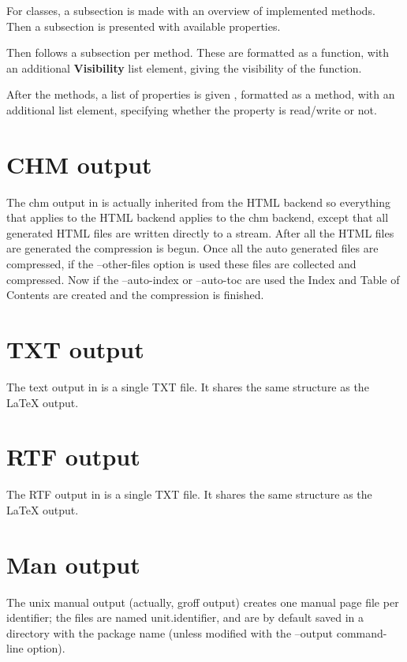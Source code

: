 For classes, a subsection is made with an overview of implemented methods.
Then a subsection is presented with available properties. 

Then follows a subsection per method. These are formatted as a function, with an
additional \textbf{Visibility} list element, giving the visibility of the
function.

After the methods, a list of properties is given , formatted as a method,
with an additional  list element, specifying whether the
property is read/write or not.

\section{CHM output}

The chm output in \fpdoc is actually inherited from the HTML backend so 
everything that applies to the HTML backend applies to the chm backend, except
that all generated HTML files are written directly to a stream. After all the
HTML files are generated the compression is begun. Once all the auto generated
files are compressed, if the --other-files option is used these files are 
collected and compressed. Now if the --auto-index or --auto-toc are used
the Index and Table of Contents are created and the compression is finished.

\section{TXT output}

The text output in \fpdoc is a single TXT file. It shares the same structure
as the LaTeX output.

\section{RTF output}

The RTF output in \fpdoc is a single TXT file. It shares the same structure
as the LaTeX output.

\section{Man output}

The unix manual output (actually, groff output) creates one manual page file 
per identifier; the files are named unit.identifier, and are by default
saved in a directory with the package name (unless modified with the
--output command-line option).


